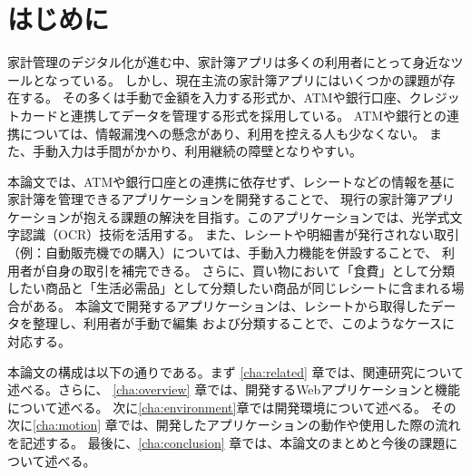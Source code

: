 \documentclass[main]{subfiles}
\begin{document}
\chapter{はじめに}
\label{cha:intro}

家計管理のデジタル化が進む中、家計簿アプリは多くの利用者にとって身近なツールとなっている。
しかし、現在主流の家計簿アプリにはいくつかの課題が存在する。
その多くは手動で金額を入力する形式か、ATMや銀行口座、クレジットカードと連携してデータを管理する形式を採用している。
ATMや銀行との連携については、情報漏洩への懸念があり、利用を控える人も少なくない。
また、手動入力は手間がかかり、利用継続の障壁となりやすい。

本論文では、ATMや銀行口座との連携に依存せず、レシートなどの情報を基に家計簿を管理できるアプリケーションを開発することで、
現行の家計簿アプリケーションが抱える課題の解決を目指す。このアプリケーションでは、光学式文字認識（OCR）技術を活用する。
また、レシートや明細書が発行されない取引（例：自動販売機での購入）については、手動入力機能を併設することで、
利用者が自身の取引を補完できる。
さらに、買い物において「食費」として分類したい商品と「生活必需品」として分類したい商品が同じレシートに含まれる場合がある。
本論文で開発するアプリケーションは、レシートから取得したデータを整理し、利用者が手動で編集
および分類することで、このようなケースに対応する。

本論文の構成は以下の通りである。まず \ref{cha:related} 章では、関連研究について述べる。さらに、
\ref{cha:overview} 章では、開発するWebアプリケーションと機能について述べる。
次に\ref{cha:environment}章では開発環境について述べる。
その次に\ref{cha:motion} 章では、開発したアプリケーションの動作や使用した際の流れを記述する。
最後に、\ref{cha:conclusion} 章では、本論文のまとめと今後の課題について述べる。
\end{document}
